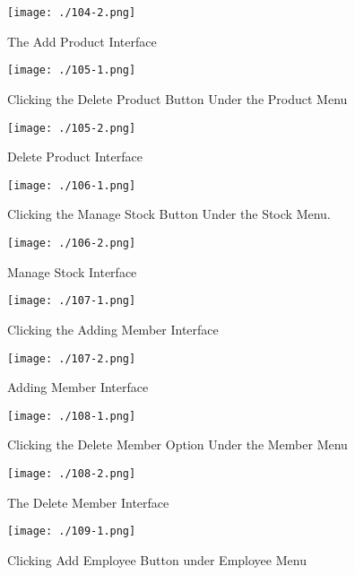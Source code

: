 \begin{figure}[H]
    \texttt{[image: ./104-2.png]}
    \caption{The Add Product Interface} \label{fig:104-2}
\end{figure}

\begin{figure}[H]
    \texttt{[image: ./105-1.png]}
    \caption{Clicking the Delete Product Button Under the Product Menu} \label{fig:105-1}
\end{figure}

\begin{figure}[H]
    \texttt{[image: ./105-2.png]}
    \caption{Delete Product Interface} \label{fig:105-2}
\end{figure}

\begin{figure}[H]
    \texttt{[image: ./106-1.png]}
    \caption{Clicking the Manage Stock Button Under the Stock Menu.} \label{fig:106-1}
\end{figure}

\begin{figure}[H]
    \texttt{[image: ./106-2.png]}
    \caption{Manage Stock Interface} \label{fig:106-2}
\end{figure}

\begin{figure}[H]
    \texttt{[image: ./107-1.png]}
    \caption{Clicking the Adding Member Interface} \label{fig:107-1}
\end{figure}

\begin{figure}[H]
    \texttt{[image: ./107-2.png]}
    \caption{Adding Member Interface} \label{fig:107-2}
\end{figure}

\begin{figure}[H]
    \texttt{[image: ./108-1.png]}
    \caption{Clicking the Delete Member Option Under the Member Menu} \label{fig:108-1}
\end{figure}

\begin{figure}[H]
    \texttt{[image: ./108-2.png]}
    \caption{The Delete Member Interface} \label{fig:108-2}
\end{figure}

\begin{figure}[H]
    \texttt{[image: ./109-1.png]}
    \caption{Clicking Add Employee Button under Employee Menu} \label{fig:109-1}
\end{figure}

